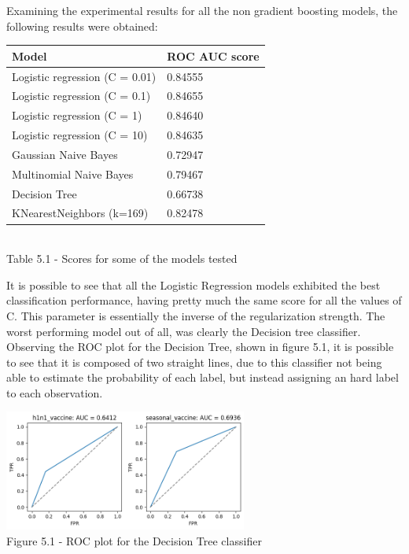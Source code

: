 \documentclass{IEEEtran}
\begin{document}
Examining the experimental results for all the non gradient boosting models, the following results were obtained:

\begin{center}
    \begin{tabular}{|l|l|}
        \hline
    \textbf{Model} & \textbf{ROC AUC score} \\ 
    \hline \hline
    Logistic regression (C = 0.01) & 0.84555 \\ \hline
    Logistic regression (C = 0.1) & 0.84655 \\ \hline
    Logistic regression (C = 1) & 0.84640 \\ \hline
    Logistic regression (C = 10) & 0.84635 \\ \hline
    Gaussian Naive Bayes & 0.72947 \\ \hline
    Multinomial Naive Bayes & 0.79467 \\ \hline
    Decision Tree & 0.66738 \\ \hline
    KNearestNeighbors (k=169) & 0.82478 \\ \hline
    \end{tabular}\\
    \vspace{7pt}
    Table 5.1 - Scores for some of the models tested
\end{center}

It is possible to see that all the Logistic Regression models exhibited the best classification performance, having pretty much the same score for all the values of C. This parameter is essentially the inverse of the regularization strength. 
The worst performing model out of all, was clearly the Decision tree classifier. Observing the ROC plot for the Decision Tree, shown in figure 5.1, it is possible to see that it is composed of two straight lines, due to this classifier not being able to estimate the probability of each label, but instead assigning an hard label to each observation.

\begin{center}
    \includegraphics[width=8cm]{figures/decisionTreeROC.png}\\
    Figure 5.1 - ROC plot for the Decision Tree classifier
\end{center}
\end{document}
